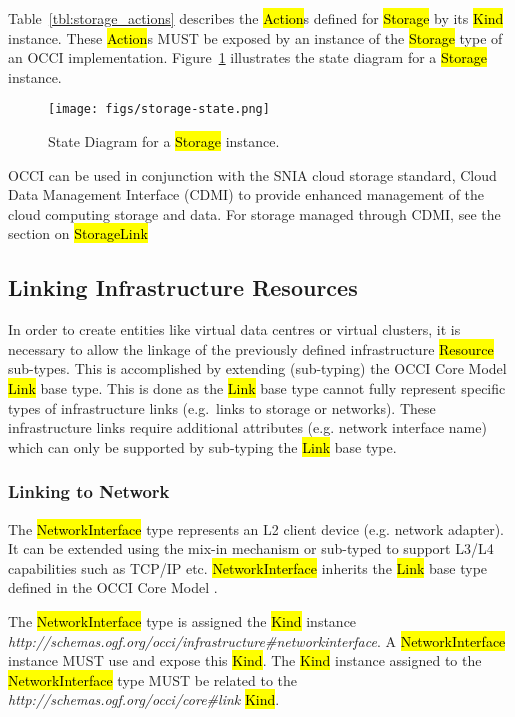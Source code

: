 \documentclass[10pt,a4paper]{article}
\begin{document}
Table~\ref{tbl:storage_actions} describes the \hl{Action}s defined for
\hl{Storage} by its \hl{Kind} instance. These \hl{Action}s MUST be exposed 
by an instance of the \hl{Storage} type of an OCCI implementation. 
Figure~\ref{fig:storage_state} illustrates the state diagram for a \hl{Storage} instance.

\begin{figure}[!h]
	\centering
	\texttt{[image: figs/storage-state.png]}
	\caption{State Diagram for a \hl{Storage} instance.}
	\label{fig:storage_state}
\end{figure}

OCCI can be used in conjunction with the SNIA cloud storage standard, Cloud Data 
Management Interface (CDMI)
\cite{cdmi} to provide enhanced management of the cloud computing storage and data. For 
storage managed through CDMI, see the section on \hl{StorageLink}

\subsection{Linking Infrastructure Resources}
In order to create entities like virtual data centres or virtual clusters, it is necessary to allow the linkage
of the previously defined infrastructure \hl{Resource} sub-types. This is accomplished by extending 
(sub-typing) the OCCI Core Model \hl{Link} base type. This is done as the \hl{Link} base type cannot 
fully represent specific types of infrastructure links (e.g.~links to storage or networks).
These infrastructure links require additional attributes (e.g.  network
interface name) which can only be supported by sub-typing the \hl{Link} base
type.

\subsubsection{Linking to Network}
The \hl{NetworkInterface} type  represents an L2 client device (e.g. network
adapter). It can be extended using the mix-in mechanism or sub-typed to support
L3/L4 capabilities such as TCP/IP etc. 
%
\hl{NetworkInterface} inherits the \hl{Link} base type defined in the OCCI Core Model \cite{occi:core}.

The \hl{NetworkInterface} type is assigned the \hl{Kind} instance
\textit{http://schemas.ogf.org/occi/infrastructure\#networkinterface}.
A \hl{NetworkInterface} instance MUST use and expose this \hl{Kind}. 
%
The \hl{Kind} instance assigned to the \hl{NetworkInterface} type MUST be
related to the \textit{http://schemas.ogf.org/occi/core\#link} \hl{Kind}.
\end{document}
